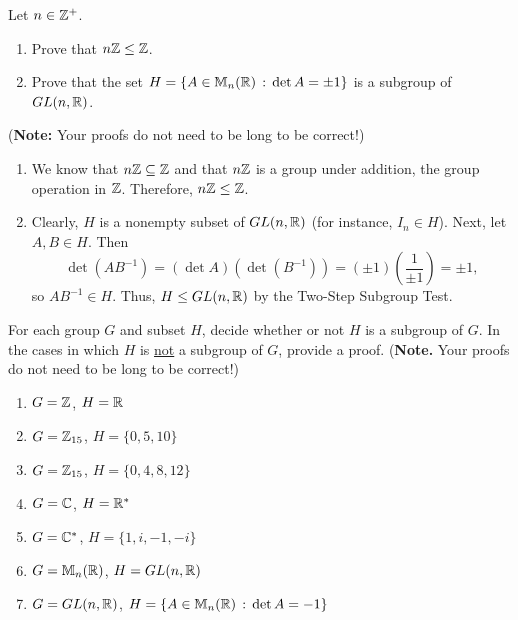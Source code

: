 \begin{exercise}
Let $n\in \mathbb{Z}^+$.
\begin{enumerate}
\item Prove that $n\mathbb{Z} \leq \mathbb{Z}$.
\item Prove that the set $H=\{A\in \mathbb{M}_n(\mathbb{R})\,:\,\det A=\pm 1\}$ is a subgroup of $GL(n,\mathbb{R})$.
\end{enumerate}
(\textbf{Note:} Your proofs do not need to be long to be correct!)
\end{exercise}

\begin{solution}[print=false]
\begin{enumerate}
\item We know that $n\mathbb{Z}\subseteq \mathbb{Z}$ and that $n\mathbb{Z}$ is a group under addition, the group operation in $\mathbb{Z}$.  Therefore, $n\mathbb{Z}\leq \mathbb{Z}$.
\item Clearly, $H$ is a nonempty subset of $GL(n,\mathbb{R})$ (for instance, $I_n\in H$).  Next, let $A,B\in H$.
Then $$\det(AB^{-1})=(\det A)(\det (B^{-1}))=(\pm 1)\left(\frac{1}{\pm 1}\right)=\pm 1,$$ so $AB^{-1}\in H$.  Thus, $H\leq GL(n,\mathbb{R})$ by the Two-Step Subgroup Test.
\end{enumerate}
\end{solution}


\begin{exercise}
For each group $G$ and subset $H$, decide whether or not $H$ is a subgroup of $G$. In the cases in which $H$ is \underline{not} a subgroup of $G$, provide a proof. (\textbf{Note.} Your proofs do not need to be long to be correct!)
\begin{enumerate}
\item $G=\mathbb{Z}$, $H=\mathbb{R}$
\item $G=\mathbb{Z}_{15}$, $H=\{0,5,10\}$
\item $G=\mathbb{Z}_{15}$, $H=\{0,4,8,12\}$
\item $G=\mathbb{C}$, $H=\mathbb{R}^*$
\item $G=\mathbb{C}^*$, $H=\{1,i,-1,-i\}$
\item $G=\mathbb{M}_n(\mathbb{R})$, $H=GL(n,\mathbb{R})$
\item $G=GL(n,\mathbb{R})$, $H=\{A\in \mathbb{M}_n(\mathbb{R})\,:\,\det A = -1\}$
\end{enumerate}
\end{exercise}

